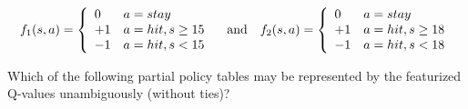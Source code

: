 \documentclass[12pt]{article}
\begin{document}
\begin{enumerate}
$$
f_1(s,a) = \left\{ \begin{array}{ll}
                  0  & a=stay \\
                  +1 & a=hit, s \geq 15 \\
                 -1  & a=hit, s < 15
                 \end{array} \right.
\quad \hbox{and} \quad
f_2(s,a) = \left\{ \begin{array}{ll}
                  0  & a=stay \\
                  +1 & a=hit, s \geq 18 \\
                 -1  & a=hit, s < 18
                 \end{array} \right.
$$

Which of the following partial policy tables may be represented by the
featurized Q-values unambiguously (without ties)?


\end{enumerate}
\end{document}
